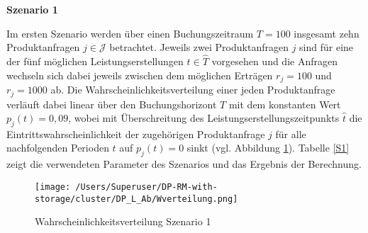 \textbf{Szenario 1}

Im ersten Szenario werden über einen Buchungszeitraum $T=100$ insgesamt zehn Produktanfragen $j\in\mathcal{J}$ betrachtet. Jeweils zwei Produktanfragen $j$ sind für eine der fünf möglichen Leistungserstellungen $\hat t\in\hat T$ vorgesehen und die Anfragen wechseln sich dabei jeweils zwischen dem möglichen Erträgen $r_j=100$ und $r_j=1000$ ab. Die Wahrscheinlichkeitsverteilung einer jeden Produktanfrage verläuft dabei linear über den Buchungshorizont $T$ mit dem konstanten Wert $p_j(t)=0,09$, wobei mit Überschreitung des Leistungserstellungszeitpunkts $\hat t$ die Eintrittswahrscheinlichkeit der zugehörigen Produktanfrage $j$ für alle nachfolgenden Perioden $t$ auf $p_j(t)=0$ sinkt (vgl. Abbildung \ref{SB1}). Tabelle \ref{S1} zeigt die verwendeten Parameter des Szenarios und das Ergebnis der Berechnung.

\begin{figure}[h!]
  \begin{center}
    \texttt{[image: /Users/Superuser/DP-RM-with-storage/cluster/DP\_L\_Ab/Wverteilung.png]}
    \caption{Wahrscheinlichkeitsverteilung Szenario 1}  \label{SB1}
  \end{center}
\end{figure}

